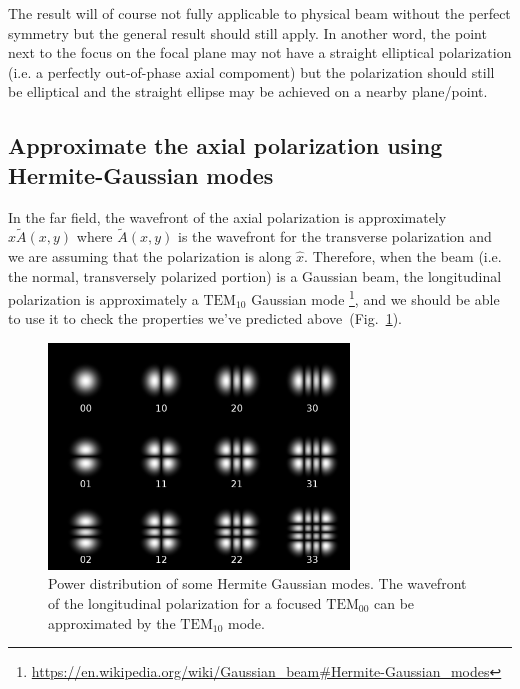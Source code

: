 \documentclass[10pt,fleqn]{article}
\begin{document}
The result will of course not fully applicable to physical beam
without the perfect symmetry but the general result should still apply.
In another word, the point next to the focus on the focal plane may not have
a straight elliptical polarization (i.e. a perfectly out-of-phase axial compoment)
but the polarization should still be elliptical and the straight ellipse
may be achieved on a nearby plane/point.\\

\subsection{Approximate the axial polarization using Hermite-Gaussian modes}
In the far field, the wavefront of the axial polarization is approximately
$x \tilde A(x, y)$ where $\tilde A(x, y)$ is the wavefront for
the transverse polarization and we are assuming that the polarization is along $\hat x$.
Therefore, when the beam (i.e. the normal, transversely polarized portion)
is a Gaussian beam, the longitudinal polarization is approximately a $\mathrm{TEM}_{10}$
Gaussian mode
\footnote{\url{https://en.wikipedia.org/wiki/Gaussian_beam\#Hermite-Gaussian_modes}},
and we should be able to use it to check the properties we've predicted above~(Fig.~\ref{fig:hermite-gaussian}).\\

\begin{figure}[h]
  \centering
  \includegraphics[width=8cm]{imgs/Hermite-gaussian.png}
  \caption{Power distribution of some Hermite Gaussian modes.
    The wavefront of the longitudinal polarization for a focused $\mathrm{TEM}_{00}$
    can be approximated by the $\mathrm{TEM}_{10}$ mode.}
  \label{fig:hermite-gaussian}
\end{figure}
\end{document}
